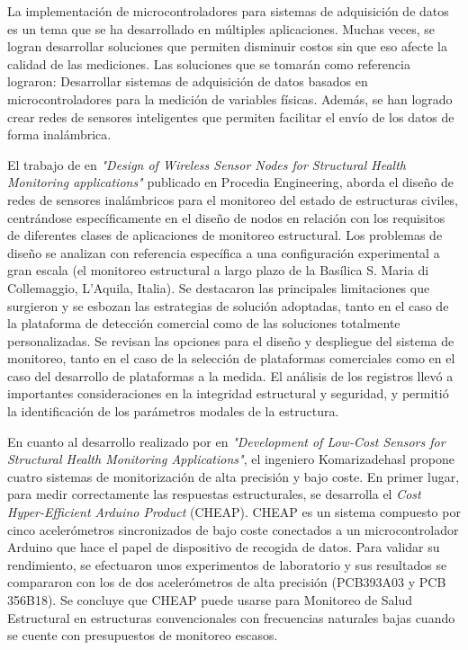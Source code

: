 \documentclass[12pt,letterpaper]{article}
\begin{document}
\vspace{1cm}

La implementación de microcontroladores para sistemas de adquisición de datos es un tema que se ha desarrollado en múltiples aplicaciones. Muchas veces, se logran desarrollar soluciones que permiten disminuir costos sin que eso afecte la calidad de las mediciones. Las soluciones que se tomarán como referencia lograron: Desarrollar sistemas de adquisición de datos basados en microcontroladores para la medición de variables físicas. Además, se han logrado crear redes de sensores inteligentes que permiten facilitar el envío de los datos de forma inalámbrica.


El trabajo de \cite{federici2014design} en \textit{"Design of Wireless Sensor Nodes for Structural Health Monitoring applications"} publicado en Procedia Engineering, aborda el diseño de redes de sensores inalámbricos para el monitoreo del estado de estructuras civiles, centrándose específicamente en el diseño de nodos en relación con los requisitos de diferentes clases de aplicaciones de monitoreo estructural.
Los problemas de diseño se analizan con referencia específica a una configuración experimental a gran escala (el monitoreo estructural a largo plazo de la Basílica S. Maria di Collemaggio, L'Aquila, Italia). Se destacaron las principales limitaciones que surgieron y se esbozan las estrategias de solución adoptadas, tanto en el caso de la plataforma de detección comercial como de las soluciones totalmente personalizadas. Se revisan las opciones para el diseño y despliegue del sistema de monitoreo, tanto en el caso de la selección de plataformas comerciales como en el caso del desarrollo de plataformas a la medida. El análisis de los registros llevó a importantes consideraciones en la integridad estructural y seguridad, y permitió la identificación de los parámetros modales de la estructura.

En cuanto al desarrollo realizado por \cite{komarizadehasl2022development} en \textit{"Development of Low-Cost Sensors for Structural Health Monitoring Applications"}, el ingeniero Komarizadehasl propone cuatro sistemas de monitorización de alta precisión y bajo coste.
En primer lugar, para medir correctamente las respuestas estructurales, se desarrolla el \textit{Cost Hyper-Efficient Arduino Product} (CHEAP). CHEAP es un sistema compuesto por cinco acelerómetros sincronizados de bajo coste conectados a un microcontrolador Arduino que hace el papel de dispositivo de recogida de datos. Para validar su rendimiento, se efectuaron unos experimentos de laboratorio y sus resultados se compararon con los de dos acelerómetros de alta precisión (PCB393A03 y PCB 356B18). Se concluye que CHEAP puede usarse para Monitoreo de Salud Estructural en estructuras convencionales con frecuencias naturales bajas cuando se cuente con presupuestos de monitoreo escasos. 
\end{document}
